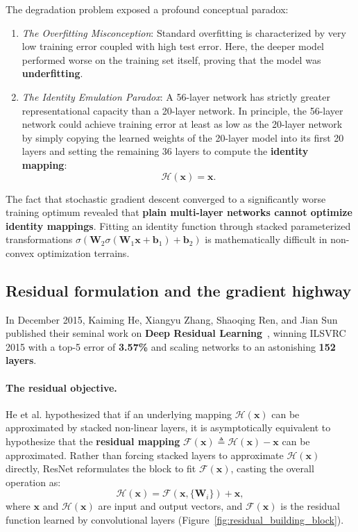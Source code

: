 The degradation problem exposed a profound conceptual paradox:
\begin{enumerate}[leftmargin=*]
  \item \textit{The Overfitting Misconception}: Standard overfitting is characterized by very low training error coupled with high test error. Here, the deeper model performed worse on the training set itself, proving that the model was \textbf{underfitting}.
  \item \textit{The Identity Emulation Paradox}: A 56-layer network has strictly greater representational capacity than a 20-layer network. In principle, the 56-layer network could achieve training error at least as low as the 20-layer network by simply copying the learned weights of the 20-layer model into its first 20 layers and setting the remaining 36 layers to compute the \textbf{identity mapping}:
    \begin{equation}
    \mathcal{H}(\mathbf{x}) = \mathbf{x}.
    \end{equation}
\end{enumerate}
The fact that stochastic gradient descent converged to a significantly worse training optimum revealed that \textbf{plain multi-layer networks cannot optimize identity mappings}. Fitting an identity function through stacked parameterized transformations $\sigma(\mathbf{W}_2 \sigma(\mathbf{W}_1 \mathbf{x} + \mathbf{b}_1) + \mathbf{b}_2)$ is mathematically difficult in non-convex optimization terrains.

\subsection{Residual formulation and the gradient highway}
\label{sec:resnet_residual_formulation}

In December 2015, Kaiming He, Xiangyu Zhang, Shaoqing Ren, and Jian Sun published their seminal work on \textbf{Deep Residual Learning}~\cite{he2016deep}, winning ILSVRC 2015 with a top-5 error of \textbf{3.57\%} and scaling networks to an astonishing \textbf{152 layers}.

\paragraph{The residual objective.}
He et al. hypothesized that if an underlying mapping $\mathcal{H}(\mathbf{x})$ can be approximated by stacked non-linear layers, it is asymptotically equivalent to hypothesize that the \textbf{residual mapping} $\mathcal{F}(\mathbf{x}) \triangleq \mathcal{H}(\mathbf{x}) - \mathbf{x}$ can be approximated. Rather than forcing stacked layers to approximate $\mathcal{H}(\mathbf{x})$ directly, ResNet reformulates the block to fit $\mathcal{F}(\mathbf{x})$, casting the overall operation as:
\begin{equation}
\mathcal{H}(\mathbf{x}) = \mathcal{F}(\mathbf{x}, \{\mathbf{W}_i\}) + \mathbf{x},
\label{eq:residual_formulation_def}
\end{equation}
where $\mathbf{x}$ and $\mathcal{H}(\mathbf{x})$ are input and output vectors, and $\mathcal{F}(\mathbf{x})$ is the residual function learned by convolutional layers (Figure~\ref{fig:residual_building_block}).

